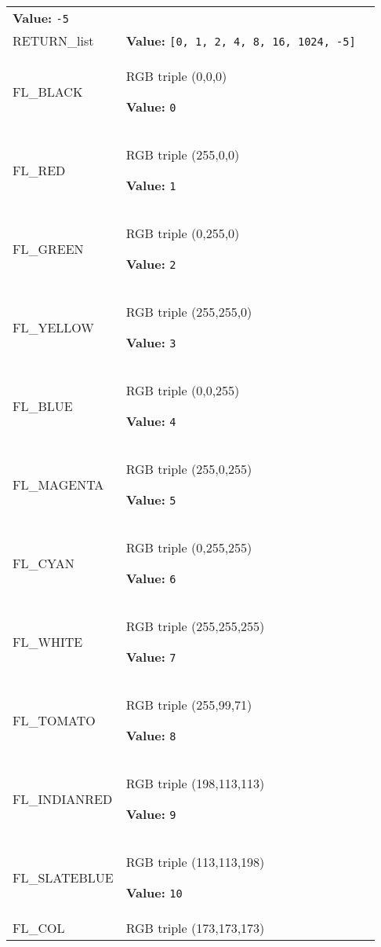 \begin{longtable}{|p{\varnamewidth}|p{\vardescrwidth}|l}
\textbf{Value:} 
{\tt -5}&\\
\cline{1-2}
\raggedright R\-E\-T\-U\-R\-N\-\_\-l\-i\-s\-t\- & \raggedright \textbf{Value:} 
{\tt \texttt{[}0\texttt{, }1\texttt{, }2\texttt{, }4\texttt{, }8\texttt{, }16\texttt{, }1024\texttt{, }-5\texttt{]}}&\\
\cline{1-2}
\raggedright F\-L\-\_\-B\-L\-A\-C\-K\- & \raggedright RGB triple (0,0,0)

\textbf{Value:} 
{\tt 0}&\\
\cline{1-2}
\raggedright F\-L\-\_\-R\-E\-D\- & \raggedright RGB triple (255,0,0)

\textbf{Value:} 
{\tt 1}&\\
\cline{1-2}
\raggedright F\-L\-\_\-G\-R\-E\-E\-N\- & \raggedright RGB triple (0,255,0)

\textbf{Value:} 
{\tt 2}&\\
\cline{1-2}
\raggedright F\-L\-\_\-Y\-E\-L\-L\-O\-W\- & \raggedright RGB triple (255,255,0)

\textbf{Value:} 
{\tt 3}&\\
\cline{1-2}
\raggedright F\-L\-\_\-B\-L\-U\-E\- & \raggedright RGB triple (0,0,255)

\textbf{Value:} 
{\tt 4}&\\
\cline{1-2}
\raggedright F\-L\-\_\-M\-A\-G\-E\-N\-T\-A\- & \raggedright RGB triple (255,0,255)

\textbf{Value:} 
{\tt 5}&\\
\cline{1-2}
\raggedright F\-L\-\_\-C\-Y\-A\-N\- & \raggedright RGB triple (0,255,255)

\textbf{Value:} 
{\tt 6}&\\
\cline{1-2}
\raggedright F\-L\-\_\-W\-H\-I\-T\-E\- & \raggedright RGB triple (255,255,255)

\textbf{Value:} 
{\tt 7}&\\
\cline{1-2}
\raggedright F\-L\-\_\-T\-O\-M\-A\-T\-O\- & \raggedright RGB triple (255,99,71)

\textbf{Value:} 
{\tt 8}&\\
\cline{1-2}
\raggedright F\-L\-\_\-I\-N\-D\-I\-A\-N\-R\-E\-D\- & \raggedright RGB triple (198,113,113)

\textbf{Value:} 
{\tt 9}&\\
\cline{1-2}
\raggedright F\-L\-\_\-S\-L\-A\-T\-E\-B\-L\-U\-E\- & \raggedright RGB triple (113,113,198)

\textbf{Value:} 
{\tt 10}&\\
\cline{1-2}
\raggedright F\-L\-\_\-C\-O\-L\-1\- & \raggedright RGB triple (173,173,173)


\end{longtable}
